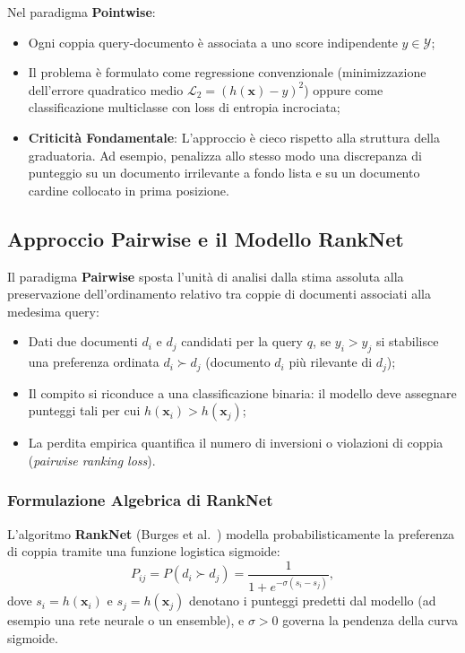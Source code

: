 Nel paradigma \textbf{Pointwise}:
\begin{itemize}
    \item Ogni coppia query-documento \`e associata a uno score indipendente $y \in \mathcal{Y}$;
    \item Il problema \`e formulato come regressione convenzionale (minimizzazione dell'errore quadratico medio $\mathcal{L}_2 = (h(\mathbf{x}) - y)^2$) oppure come classificazione multiclasse con loss di entropia incrociata;
    \item \textbf{Criticit\`a Fondamentale}: L'approccio \`e cieco rispetto alla struttura della graduatoria. Ad esempio, penalizza allo stesso modo una discrepanza di punteggio su un documento irrilevante a fondo lista e su un documento cardine collocato in prima posizione.
\end{itemize}

\FloatBarrier
\subsection{Approccio Pairwise e il Modello RankNet}
\label{subsec:approccio-pairwise-ranknet}

Il paradigma \textbf{Pairwise} sposta l'unit\`a di analisi dalla stima assoluta alla preservazione dell'ordinamento relativo tra coppie di documenti associati alla medesima query:
\begin{itemize}
    \item Dati due documenti $d_i$ e $d_j$ candidati per la query $q$, se $y_i > y_j$ si stabilisce una preferenza ordinata $d_i \succ d_j$ (documento $d_i$ pi\`u rilevante di $d_j$);
    \item Il compito si riconduce a una classificazione binaria: il modello deve assegnare punteggi tali per cui $h(\mathbf{x}_i) > h(\mathbf{x}_j)$;
    \item La perdita empirica quantifica il numero di inversioni o violazioni di coppia (\emph{pairwise ranking loss}).
\end{itemize}

\subsubsection{Formulazione Algebrica di RankNet}
L'algoritmo \textbf{RankNet} (Burges et al.~\cite{burges2010}) modella probabilisticamente la preferenza di coppia tramite una funzione logistica sigmoide:
\begin{equation}
    P_{ij} = P(d_i \succ d_j) = \frac{1}{1 + e^{-\sigma (s_i - s_j)}},
    \label{eq:ranknet-probability}
\end{equation}
dove $s_i = h(\mathbf{x}_i)$ e $s_j = h(\mathbf{x}_j)$ denotano i punteggi predetti dal modello (ad esempio una rete neurale o un ensemble), e $\sigma > 0$ governa la pendenza della curva sigmoide.


